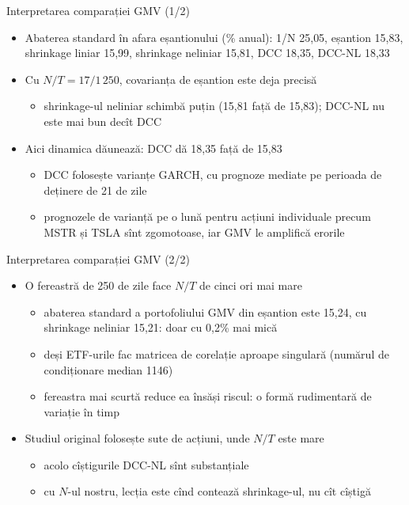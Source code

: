 \begin{frame}{Interpretarea comparației GMV (1/2)}
\itemsize{\small}
\begin{itemize}
    \item Abaterea standard în afara eșantionului (\% anual): 1/N 25{,}05, eșantion 15{,}83, shrinkage liniar 15{,}99, shrinkage neliniar 15{,}81, DCC 18{,}35, DCC-NL 18{,}33
    \item Cu $N/T = 17/1\,250$, covarianța de eșantion este deja precisă
    \begin{itemize}
        \item shrinkage-ul neliniar schimbă puțin (15{,}81 față de 15{,}83); DCC-NL nu este mai bun decît DCC
    \end{itemize}
    \item Aici dinamica dăunează: DCC dă 18{,}35 față de 15{,}83
    \begin{itemize}
        \item DCC folosește varianțe GARCH, cu prognoze mediate pe perioada de deținere de 21 de zile
        \item prognozele de varianță pe o lună pentru acțiuni individuale precum MSTR și TSLA sînt zgomotoase, iar GMV le amplifică erorile
    \end{itemize}
\end{itemize}
\end{frame}

\begin{frame}{Interpretarea comparației GMV (2/2)}
\itemsize{\small}
\begin{itemize}
    \item O fereastră de 250 de zile face $N/T$ de cinci ori mai mare
    \begin{itemize}
        \item abaterea standard a portofoliului GMV din eșantion este 15{,}24, cu shrinkage neliniar 15{,}21: doar cu 0{,}2\% mai mică
        \item deși ETF-urile fac matricea de corelație aproape singulară (numărul de condiționare median 1146)
        \item fereastra mai scurtă reduce ea însăși riscul: o formă rudimentară de variație în timp
    \end{itemize}
    \item Studiul original folosește sute de acțiuni, unde $N/T$ este mare
    \begin{itemize}
        \item acolo cîștigurile DCC-NL sînt substanțiale
        \item cu $N$-ul nostru, lecția este cînd contează shrinkage-ul, nu cît cîștigă
    \end{itemize}
\end{itemize}
\end{frame}

